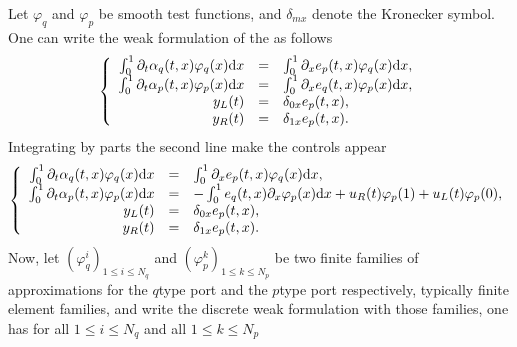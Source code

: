 \documentclass[letterpaper,10pt,english]{sphinxmanual}
\begin{document}
\sphinxAtStartPar
Let \(\varphi_q\) and \(\varphi_p\) be smooth test functions,
and \(\delta_{mx}\) denote the Kronecker symbol. One can write the
weak formulation of the  as follows
\begin{equation*}
\begin{split}\left\lbrace
\begin{array}{rcl}
\int_0^1 \partial_t \alpha_q(t,x) \varphi_q(x) {\rm d}x &=& \int_0^1 \partial_x e_p(t,x) \varphi_q(x) {\rm d}x, \\
\int_0^1 \partial_t \alpha_p(t,x) \varphi_p(x) {\rm d}x &=& \int_0^1 \partial_x e_q(t,x) \varphi_p(x) {\rm d}x, \\
y_L(t) &=& \delta_{0x} e_p(t,x), \\
y_R(t) &=& \delta_{1x} e_p(t,x).
\end{array}
\right.\end{split}
\end{equation*}
\sphinxAtStartPar
Integrating by parts the second line make the controls appear
\begin{equation*}
\begin{split}\left\lbrace
\begin{array}{rcl}
\int_0^1 \partial_t \alpha_q(t,x) \varphi_q(x) {\rm d}x &=& \int_0^1 \partial_x e_p(t,x) \varphi_q(x) {\rm d}x, \\
\int_0^1 \partial_t \alpha_p(t,x) \varphi_p(x) {\rm d}x &=& - \int_0^1 e_q(t,x) \partial_x \varphi_p(x) {\rm d}x + u_R(t) \varphi_p(1) + u_L(t) \varphi_p(0), \\
y_L(t) &=& \delta_{0x} e_p(t,x), \\
y_R(t) &=& \delta_{1x} e_p(t,x).
\end{array}
\right.\end{split}
\end{equation*}
\sphinxAtStartPar
Now, let \((\varphi_q^i)_{1 \le i \le N_q}\) and
\((\varphi_p^k)_{1 \le k \le N_p}\) be two finite families of
approximations for the \(q\)\sphinxhyphen{}type port and the \(p\)\sphinxhyphen{}type port
respectively, typically finite element families, and write the discrete
weak formulation with those families, one has for all
\(1 \le i \le N_q\) and all \(1 \le k \le N_p\)
\end{document}
